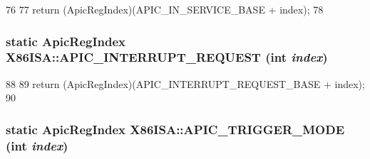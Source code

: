 \begin{DoxyCode}
76     {
77         return (ApicRegIndex)(APIC_IN_SERVICE_BASE + index);
78     }
\end{DoxyCode}
\hypertarget{namespaceX86ISA_a3c8c801a8304b85b8c6ae6ca3ac00f74}{
\subsubsection[{APIC\_\-INTERRUPT\_\-REQUEST}]{\setlength{\rightskip}{0pt plus 5cm}static {\bf ApicRegIndex} X86ISA::APIC\_\-INTERRUPT\_\-REQUEST (int {\em index})}}
\label{namespaceX86ISA_a3c8c801a8304b85b8c6ae6ca3ac00f74}



\begin{DoxyCode}
88     {
89         return (ApicRegIndex)(APIC_INTERRUPT_REQUEST_BASE + index);
90     }
\end{DoxyCode}
\hypertarget{namespaceX86ISA_afdf90895c5487dc266f742f30bb4a568}{
\subsubsection[{APIC\_\-TRIGGER\_\-MODE}]{\setlength{\rightskip}{0pt plus 5cm}static {\bf ApicRegIndex} X86ISA::APIC\_\-TRIGGER\_\-MODE (int {\em index})}}
\label{namespaceX86ISA_afdf90895c5487dc266f742f30bb4a568}



